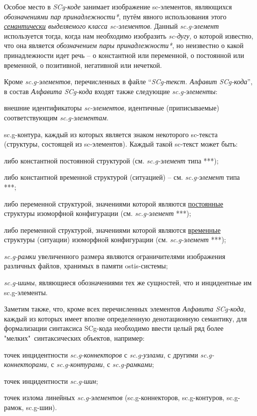 \begin{SCn}
{Особое место в \textit{SCg-коде} занимает изображение sc-элементов, являющихся \textit{обозначениями пар принадлежности*}, путём явного использования этого \textit {\uline{семантически} выделяемого класса sc-элементов}.
Данный \textit{sc.g-элемент} используется тогда, когда нам необходимо изобразить \textit{sc-дугу}, о которой известно, что она является \textit{обозначением пары принадлежности*}, но неизвестно о какой принадлежности идет речь -- о константной или переменной, о постоянной или временной, о позитивной, негативной или нечеткой.

Кроме\textit{ sc.g-элементов}, перечисленных в файле ``\textit{SCg-текст. Алфавит SCg-кода}'', в состав \textit{Алфавита SCg-кода} входят также следующие \textit{sc.g-элементы}:
\begin{scnitemize}
\item внешние идентификаторы \textit{sc-элементов}, идентичные (приписываемые) соответствующим \textit{sc.g-элементам}.
\item sc.g-контура, каждый из которых является знаком некоторого sc-текста (структуры, состоящей из sc-элементов). Каждый такой sc-текст может быть:
\begin{scnitemizeii}
\item либо константной постоянной структурой (см. \textit{sc.g-элемент} типа ***);
\item либо константной временной структурой (ситуацией) -- см. \textit{sc.g-элемент} типа ***;
\item либо переменной структурой, значениями которой являются \uline{постоянные} структуры изоморфной  конфигурации (см. \textit{sc.g-элемент} ***);
\item либо переменной структурой, значениями которой являются \uline{временные} структуры (ситуации) изоморфной  конфигурации (см. \textit{sc.g-элемент} ***);
\end{scnitemizeii}

\item \textit{sc.g-рамки} увеличенного размера являются ограничителями изображения различных файлов, хранимых в памяти ostis-системы;
\item \textit{sc.g-шины}, являющиеся обозначениями тех же сущностей, что и инцидентные им sc.g-элементы.
\end{scnitemize}

Заметим также, что, кроме всех перечисленных элементов \textit{Алфавита SCg-кода}, каждый из которых имеет вполне определенную денотационную  семантику, для формализации синтаксиса SCg-кода необходимо ввести целый ряд более "мелких"\ синтаксических объектов, например:
\begin{scnitemize}
\item точек инцидентности \textit{sc.g-коннекторов} с \textit{sc.g-узлами}, с другими \textit{sc.g-коннекторами}, с \textit{sc.g-контурами}, с \textit{sc.g-рамками};
\item точек инцидентности \textit{sc.g-шин};
\item точек излома линейных \textit{sc.g-элементов} (sc.g-коннекторов, sc.g-контуров, sc.g-рамок, sc.g-шин).
\end{scnitemize}
}


\end{SCn}
